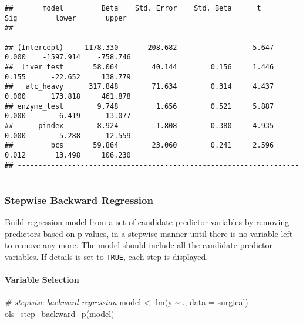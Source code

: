 \documentclass[
]{article}
\newenvironment{Shaded}{\begin{snugshade}}{\end{snugshade}}
\newcommand{\AttributeTok}[1]{\textcolor[rgb]{0.77,0.63,0.00}{#1}}
\newcommand{\CommentTok}[1]{\textcolor[rgb]{0.56,0.35,0.01}{\textit{#1}}}
\newcommand{\FunctionTok}[1]{\textcolor[rgb]{0.00,0.00,0.00}{#1}}
\newcommand{\NormalTok}[1]{#1}
\newcommand{\OtherTok}[1]{\textcolor[rgb]{0.56,0.35,0.01}{#1}}
\newcommand{\SpecialCharTok}[1]{\textcolor[rgb]{0.00,0.00,0.00}{#1}}
\begin{document}
\begin{verbatim}
##       model         Beta    Std. Error    Std. Beta      t        Sig         lower       upper 
## ------------------------------------------------------------------------------------------------
## (Intercept)    -1178.330       208.682                 -5.647    0.000    -1597.914    -758.746 
##  liver_test       58.064        40.144        0.156     1.446    0.155      -22.652     138.779 
##   alc_heavy      317.848        71.634        0.314     4.437    0.000      173.818     461.878 
## enzyme_test        9.748         1.656        0.521     5.887    0.000        6.419      13.077 
##      pindex        8.924         1.808        0.380     4.935    0.000        5.288      12.559 
##         bcs       59.864        23.060        0.241     2.596    0.012       13.498     106.230 
## ------------------------------------------------------------------------------------------------
\end{verbatim}

\hypertarget{stepwise-backward-regression}{%
\subsubsection{Stepwise Backward
Regression}\label{stepwise-backward-regression}}

Build regression model from a set of candidate predictor variables by
removing predictors based on p values, in a stepwise manner until there
is no variable left to remove any more. The model should include all the
candidate predictor variables. If details is set to \texttt{TRUE}, each
step is displayed.

\hypertarget{variable-selection-2}{%
\paragraph{Variable Selection}\label{variable-selection-2}}

\begin{Shaded}
\begin{Highlighting}[]
\CommentTok{\# stepwise backward regression}
\NormalTok{model }\OtherTok{\textless{}{-}} \FunctionTok{lm}\NormalTok{(y }\SpecialCharTok{\textasciitilde{}}\NormalTok{ ., }\AttributeTok{data =}\NormalTok{ surgical)}
\FunctionTok{ols\_step\_backward\_p}\NormalTok{(model)}
\end{Highlighting}
\end{Shaded}
\end{document}
